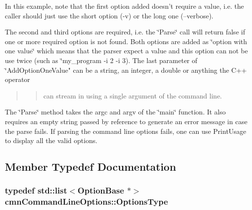 In this example, note that the first option added doesn't require a value, i.\-e. the caller should just use the short option (-\/v) or the long one (--verbose).

The second and third options are required, i.\-e. the \char`\"{}\-Parse\char`\"{} call will return false if one or more required option is not found. Both options are added as \char`\"{}option with one value\char`\"{} which means that the parser expect a value and this option can not be use twice (such as \char`\"{}my\-\_\-program -\/i 2 -\/i 3).  The last parameter of \char`\"{}Add\-Option\-One\-Value" can be a string, an integer, a double or anything the C++ operator \begin{quotation}
\begin{quotation}
can stream in using a single argument of the command line.

\end{quotation}


\end{quotation}


The \char`\"{}\-Parse\char`\"{} method takes the argc and argv of the \char`\"{}main\char`\"{} function. It also requires an empty string passed by reference to generate an error message in case the parse fails. If parsing the command line options fails, one can use Print\-Usage to display all the valid options. 

\subsection{Member Typedef Documentation}
\hypertarget{classcmn_command_line_options_a421232856a8c450024b205ed8a4c4c7d}{
\subsubsection[{Options\-Type}]{\setlength{\rightskip}{0pt plus 5cm}typedef std\-::list$<${\bf Option\-Base} $\ast$$>$ {\bf cmn\-Command\-Line\-Options\-::\-Options\-Type}\hspace{0.3cm}{\ttfamily [protected]}}}\label{classcmn_command_line_options_a421232856a8c450024b205ed8a4c4c7d}


